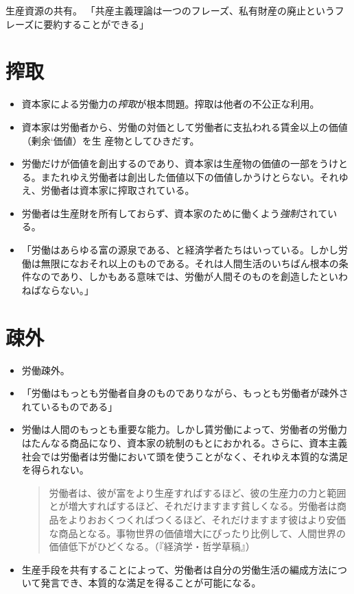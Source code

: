 \documentclass[]{jsarticle}
\begin{document}
生産資源の共有。
「共産主義理論は一つのフレーズ、私有財産の廃止というフレーズに要約することができる」



\section{搾取}

\begin{itemize}
\item 資本家による労働力の\emph{搾取}が根本問題。搾取は他者の不公正な利用。
\item 資本家は労働者から、労働の対価として労働者に支払われる賃金以上の価値（剰余`価値）を生
  産物としてひきだす。
\item 労働だけが価値を創出するのであり、資本家は生産物の価値の一部をうけとる。またれゆえ労働者は創出した価値以下の価値しかうけとらない。それゆえ、労働者は資本家に搾取されている。
\item 労働者は生産財を所有しておらず、資本家のために働くよう\emph{強制}されている。

\item 「労働はあらゆる富の源泉である、と経済学者たちはいっている。しかし労働は無限になおそれ以上のものである。それは人間生活のいちばん根本の条件なのであり、しかもある意味では、労働が人間そのものを創造したといわねばならない。」

\end{itemize}

\section{疎外}

\begin{itemize}
\item 労働疎外。


\item 「労働はもっとも労働者自身のものでありながら、もっとも労働者が疎外されているものである」
\item 労働は人間のもっとも重要な能力。しかし賃労働によって、労働者の労働力はたんなる商品になり、資本家の統制のもとにおかれる。さらに、資本主義社会では労働者は労働において頭を使うことがなく、それゆえ本質的な満足を得られない。

  \begin{quote}
    労働者は、彼が富をより生産すればするほど、彼の生産力の力と範囲とが増大すればするほど、それだけますます貧しくなる。労働者は商品をよりおおくつくればつくるほど、それだけますます彼はより安価な商品となる。事物世界の価値増大にぴったり比例して、人間世界の価値低下がひどくなる。（『経済学・哲学草稿』）
  \end{quote}


\item 生産手段を共有することによって、労働者は自分の労働生活の編成方法について発言でき、本質的な満足を得ることが可能になる。

\end{itemize}
\end{document}
